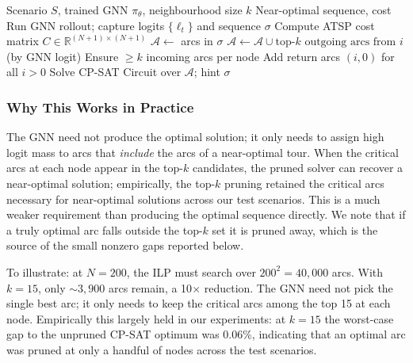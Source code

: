 \documentclass[review,times]{elsarticle}
\begin{document}
\begin{algorithm}[htbp]
\caption{GNN-Guided Arc Pruning}
\label{alg:pruned}
\begin{algorithmic}[1]
\REQUIRE Scenario $S$, trained GNN $\pi_\theta$, neighbourhood size $k$
\ENSURE Near-optimal sequence, cost
\STATE Run GNN rollout; capture logits $\{\ell_t\}$ and sequence $\sigma$
\STATE Compute ATSP cost matrix $C \in \mathbb{R}^{(N+1)\times(N+1)}$
\STATE $\mathcal{A} \leftarrow$ arcs in $\sigma$
    \STATE $\mathcal{A} \leftarrow \mathcal{A} \cup \text{top-}k\text{ outgoing arcs from } i$ (by GNN logit)
\ENDFOR
\STATE Ensure $\geq k$ incoming arcs per node
\STATE Add return arcs $(i, 0)$ for all $i > 0$
\STATE Solve CP-SAT Circuit over $\mathcal{A}$; hint $\sigma$
\end{algorithmic}
\end{algorithm}

\subsubsection{Why This Works in Practice} The GNN need not produce the optimal solution; it only needs to assign high logit mass to arcs that \emph{include} the arcs of a near-optimal tour. When the critical arcs at each node appear in the top-$k$ candidates, the pruned solver can recover a near-optimal solution; empirically, the top-$k$ pruning retained the critical arcs necessary for near-optimal solutions across our test scenarios. This is a much weaker requirement than producing the optimal sequence directly. We note that if a truly optimal arc falls outside the top-$k$ set it is pruned away, which is the source of the small nonzero gaps reported below.

To illustrate: at $N{=}200$, the ILP must search over $200^2 = 40{,}000$ arcs. With $k{=}15$, only ${\sim}3{,}900$ arcs remain, a 10$\times$ reduction. The GNN need not pick the single best arc; it only needs to keep the critical arcs among the top 15 at each node. Empirically this largely held in our experiments: at $k{=}15$ the worst-case gap to the unpruned CP-SAT optimum was 0.06\%, indicating that an optimal arc was pruned at only a handful of nodes across the test scenarios.
\end{document}
